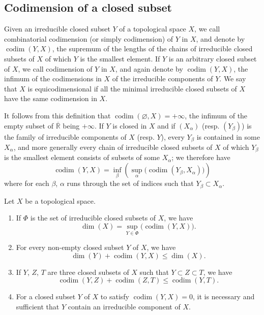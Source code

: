 \subsection{Codimension of a closed subset}
\label{subsection:0.14.2}

\begin{definition}[14.2.1]
\label{0.14.2.1}
Given an irreducible closed subset $Y$ of a topological space $X$,
we call combinatorial codimension \textup{(or simply} codimension)
of $Y$ in $X$, and denote by $\operatorname{codim}(Y,X)$, the supremum
of the lengths of the chains of irreducible closed subsets of $X$ of which $Y$
is the smallest element. If $Y$ is an arbitrary closed subset of $X$, we
call codimension of $Y$ in $X$, and again denote by
$\operatorname{codim}(Y,X)$, the infimum of the codimensions in $X$ of the
irreducible components of $Y$. We say that $X$ is
equicodimensional if all the minimal irreducible closed subsets
of $X$ have the same codimension in $X$.
\end{definition}

It follows from this definition that
$\operatorname{codim}(\varnothing,X)=+\infty$, the infimum of the
empty subset of $\overline{\mathbb R}$ being $+\infty$. If $Y$ is closed in
$X$ and if $(X_\alpha)$ (resp. $(Y_\beta)$) is the family of irreducible
components of $X$ (resp. $Y$), every $Y_\beta$ is contained in some
$X_\alpha$, and more generally every chain of irreducible closed
subsets of $X$ of which $Y_\beta$ is the smallest element consists of
subsets of some $X_\alpha$; we therefore have
\[
  \operatorname{codim}(Y,X)=
  \inf_\beta\left(\sup_\alpha
  \bigl(\operatorname{codim}(Y_\beta,X_\alpha)\bigr)\right)
  \tag{14.2.1.1}\label{0.14.2.1.1}
\]
where for each $\beta$, $\alpha$ runs through the set of indices such that
$Y_\beta\subset X_\alpha$.

\begin{proposition}[14.2.2]
\label{0.14.2.2}
Let $X$ be a topological space.
\begin{enumerate}
  \item[\rm(i)] If $\Phi$ is the set of irreducible closed subsets of
  $X$, we have
  \[
    \dim(X)=\sup_{Y\in\Phi}\bigl(\operatorname{codim}(Y,X)\bigr).
    \tag{14.2.2.1}\label{0.14.2.2.1}
  \]
  \item[\rm(ii)] For every non-empty closed subset $Y$ of $X$, we have
  \[
    \dim(Y)+\operatorname{codim}(Y,X)\leq\dim(X).
    \tag{14.2.2.2}\label{0.14.2.2.2}
  \]
  \item[\rm(iii)] If $Y$, $Z$, $T$ are three closed subsets of $X$ such
  that $Y\subset Z\subset T$, we have
  \[
    \operatorname{codim}(Y,Z)+\operatorname{codim}(Z,T)
    \leq\operatorname{codim}(Y,T).
    \tag{14.2.2.3}\label{0.14.2.2.3}
  \]
  \item[\rm(iv)] For a closed subset $Y$ of $X$ to satisfy
  $\operatorname{codim}(Y,X)=0$, it is necessary and sufficient that $Y$ contain an
  irreducible component of $X$.
\end{enumerate}
\end{proposition}

